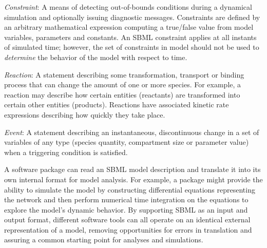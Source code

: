 \begin{description}
\item \emph{Constraint}: A means of detecting out-of-bounds
  conditions during a dynamical simulation and optionally issuing
  diagnostic messages.  Constraints are defined by an arbitrary
  mathematical expression computing a true/false value from model
  variables, parameters and constants.  An SBML constraint applies
  at all instants of simulated time; however, the set of
  constraints in model should not be used to \emph{determine} the
  behavior of the model with respect to time.
  
\item \emph{Reaction}: A statement describing some transformation,
  transport or binding process that can change the amount of one
  or more species.  For example, a reaction may describe how
  certain entities (reactants) are transformed into certain other
  entities (products).  Reactions have associated kinetic rate
  expressions describing how quickly they take place.
  
\item \emph{Event}: A statement describing an instantaneous,
  discontinuous change in a set of variables of any type (species
  quantity, compartment size or parameter value) when a
  triggering condition is satisfied.

\end{description}

A software package can read an SBML model description and
translate it into its own internal format for model analysis.  For
example, a package might provide the ability to simulate the model
by constructing differential equations representing the network
and then perform numerical time integration on the equations to
explore the model's dynamic behavior.  By supporting SBML as an
input and output format, different software tools can all operate
on an identical external representation of a model, removing
opportunities for errors in translation and assuring a common
starting point for analyses and simulations.
